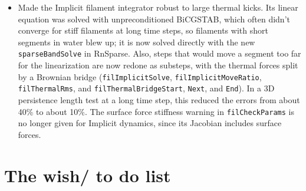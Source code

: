 \documentclass {scrbook}
\newcommand {\ttt} {\texttt}
\begin{document}
\begin{itemize}
\item Made the Implicit filament integrator robust to large thermal kicks. Its linear equation was solved with unpreconditioned BiCGSTAB, which often didn't converge for stiff filaments at long time steps, so filaments with short segments in water blew up; it is now solved directly with the new \ttt{sparseBandSolve} in RnSparse. Also, steps that would move a segment too far for the linearization are now redone as substeps, with the thermal forces split by a Brownian bridge (\ttt{filImplicitSolve}, \ttt{filImplicitMoveRatio}, \ttt{filThermalRms}, and \ttt{filThermalBridgeStart}, \ttt{Next}, and \ttt{End}). In a 3D persistence length test at a long time step, this reduced the errors from about 40\% to about 10\%. The surface force stiffness warning in \ttt{filCheckParams} is no longer given for Implicit dynamics, since its Jacobian includes surface forces.
\end{itemize}




\chapter{The wish/ to do list}

\end{document}
